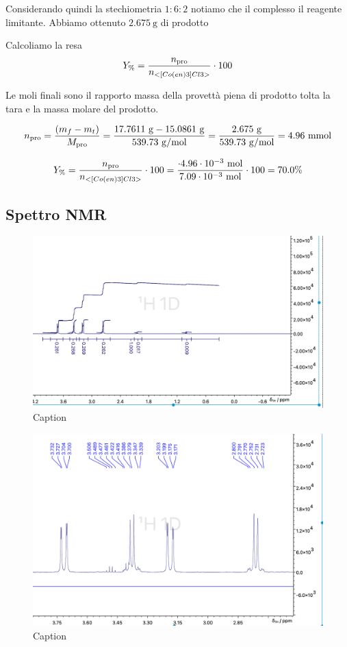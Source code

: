 Considerando quindi la stechiometria $1: 6: 2$ notiamo che il complesso il reagente limitante. Abbiamo ottenuto $ 2.675 \mathrm{~g}$ di prodotto



Calcoliamo la resa 
\[ Y_\% = \frac{n_\text{pro}}{n_{<[Co(en)3]Cl3>}}\cdot 100 \]

Le moli finali sono il rapporto massa della provettà piena di prodotto tolta la tara e la massa molare del prodotto.

\[ n_\text{pro} = \frac{(m_{f} - m_{t})}{M_\text{pro}} 
 = \frac{ 17.7611 \mathrm{\ g} - 15.0861 \mathrm{\ g} }{ 539.73 \mathrm{\ g/mol}} =  \frac{2.675 \mathrm{~g}}{539.73 \mathrm{~g} / \mathrm{mol}}=4.96 \mathrm{\ mmol}\]

\[ Y_\% = \frac{n_\text{pro}}{n_{<[Co(en)3]Cl3>}}\cdot 100  = \frac{ \cdot 4.96 \cdot 10^{-3} \mathrm{~mol}}{7.09 \cdot 10^{-3} \mathrm{~mol}} \cdot 100 =70.0\%\]

\subsection{Spettro NMR}



\begin{figure}
    \centering
    \includegraphics[width=0.8\linewidth]{Relazione/foto/Dinosar_integration_zoom.png}
    \caption{Caption}
    \label{fig:dinosarint}
\end{figure}



\begin{figure}
    \centering
    \includegraphics[width=0.8\linewidth]{Relazione/foto/Dinosar_peak_calc.png}
    \caption{Caption}
    \label{fig:dinosarpeakcalc}
\end{figure}



